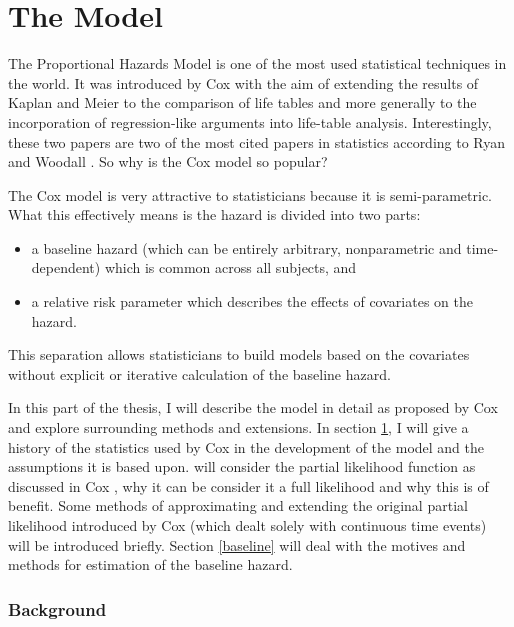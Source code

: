\newpage
\part{The Model}

The Proportional Hazards Model is one of the most used statistical techniques in the world. It was introduced by Cox  with the aim of extending the results of Kaplan and Meier  to the comparison of life tables and more generally to the incorporation of regression-like arguments into life-table analysis. Interestingly, these two papers are two of the most cited papers in statistics according to Ryan and Woodall . So why is the Cox model so popular?

The Cox model is very attractive to statisticians because it is semi-parametric. What this effectively means is the hazard is divided into two parts:

\begin{itemize}
    \item a baseline hazard (which can be entirely arbitrary, nonparametric and time-dependent) which is common across all subjects, and
    \item a relative risk parameter which describes the effects of covariates on the hazard.
\end{itemize} 

This separation allows statisticians to build models based on the covariates without explicit or iterative calculation of the baseline hazard.

In this part of the thesis, I will describe the model in detail as proposed by Cox and explore surrounding methods and extensions. In section \ref{background}, I will give a history of the statistics used by Cox in the development of the model and the assumptions it is based upon.  will consider the partial likelihood function as discussed in Cox , why it can be consider it a full likelihood and why this is of benefit. Some methods of approximating and extending the original partial likelihood introduced by Cox  (which dealt solely with continuous time events) will be introduced briefly. Section \ref{baseline} will deal with the motives and methods for estimation of the baseline hazard.

\section{Background}\label{background}

